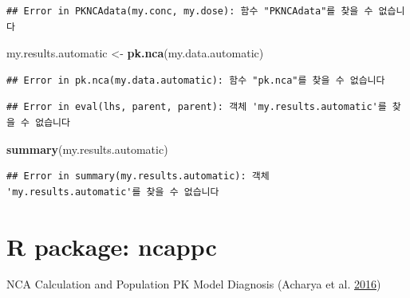 \documentclass[12pt,]{krantz}
\newenvironment{Shaded}{\begin{snugshade}}{\end{snugshade}}
\newcommand{\DataTypeTok}[1]{\textcolor[rgb]{0.13,0.29,0.53}{#1}}
\newcommand{\KeywordTok}[1]{\textcolor[rgb]{0.13,0.29,0.53}{\textbf{#1}}}
\newcommand{\NormalTok}[1]{#1}
\newcommand{\OperatorTok}[1]{\textcolor[rgb]{0.81,0.36,0.00}{\textbf{#1}}}
\newcommand{\StringTok}[1]{\textcolor[rgb]{0.31,0.60,0.02}{#1}}
\begin{document}
\begin{verbatim}
## Error in PKNCAdata(my.conc, my.dose): 함수 "PKNCAdata"를 찾을 수 없습니다
\end{verbatim}

\begin{Shaded}
\begin{Highlighting}[]
\NormalTok{my.results.automatic <-}\StringTok{ }\KeywordTok{pk.nca}\NormalTok{(my.data.automatic)}
\end{Highlighting}
\end{Shaded}

\begin{verbatim}
## Error in pk.nca(my.data.automatic): 함수 "pk.nca"를 찾을 수 없습니다
\end{verbatim}

\begin{Shaded}
\end{Shaded}

\begin{verbatim}
## Error in eval(lhs, parent, parent): 객체 'my.results.automatic'를 찾을 수 없습니다
\end{verbatim}

\begin{Shaded}
\begin{Highlighting}[]
\KeywordTok{summary}\NormalTok{(my.results.automatic)}
\end{Highlighting}
\end{Shaded}

\begin{verbatim}
## Error in summary(my.results.automatic): 객체 'my.results.automatic'를 찾을 수 없습니다
\end{verbatim}

\hypertarget{r-package-ncappc}{%
\section{R package: ncappc}\label{r-package-ncappc}}

NCA Calculation and Population PK Model Diagnosis (Acharya et al. \protect\hyperlink{ref-Acharya201683}{2016})
\end{document}
